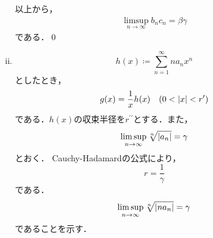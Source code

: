 \begin{enumerate}[(1)]
\begin{enumerate}[(i)]
        以上から，
        \begin{align}
            \limsup_{n\to\infty}b_nc_n=\beta\gamma
        \end{align}
        である．\qed
        \item 
        \begin{equation}
            h(x)\coloneqq\sum_{n=1}^\infty na_nx^{n}
        \end{equation}
        としたとき，
        \begin{equation}
            g(x)=\frac{1}{x}h(x) \quad (0<\abs{x}<r^\prime)
        \end{equation}
        である．$h(x)$の収束半径を$r^{\prime\prime}$とする．また，
        \begin{equation}
            \limsup_{n\to\infty}\sqrt[n]{\abs{a_n}}=\gamma
        \end{equation}
        とおく．
        Cauchy-Hadamardの公式により，
        \begin{equation}
            r=\frac{1}{\gamma}
        \end{equation}
        である．
        \begin{equation}
            \limsup_{n\to\infty}\sqrt[n]{\abs{na_n}}=\gamma
        \end{equation}
        であることを示す．
        

\end{enumerate}
\end{enumerate}
